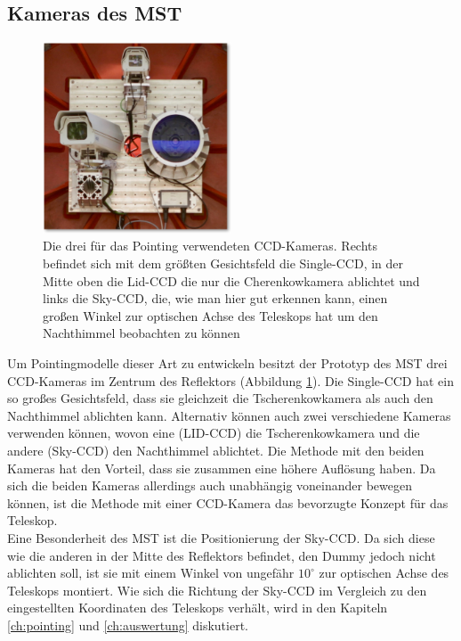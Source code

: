 \subsection{Kameras des MST}
\label{se:cameras}
\begin{figure}
\centering
\includegraphics[width=0.5\textwidth]{Images/ccd.png}
\caption{Die drei für das Pointing verwendeten CCD-Kameras. Rechts befindet sich mit dem größten Gesichtsfeld die Single-CCD, in der Mitte oben die Lid-CCD die nur die Cherenkowkamera ablichtet und links die Sky-CCD, die, wie man hier gut erkennen kann, einen großen Winkel zur optischen Achse des Teleskops hat um den Nachthimmel beobachten zu können}
\label{img:cameras}
\end{figure}
Um Pointingmodelle dieser Art zu entwickeln besitzt der Prototyp des MST drei CCD-Kameras im Zentrum des Reflektors (Abbildung \ref{img:cameras}). Die Single-CCD hat ein so großes Gesichtsfeld, dass sie gleichzeit die Tscherenkowkamera als auch den Nachthimmel ablichten kann. Alternativ können auch zwei verschiedene Kameras verwenden können, wovon eine (LID-CCD) die Tscherenkowkamera und die andere (Sky-CCD) den Nachthimmel ablichtet. Die Methode mit den beiden Kameras hat den Vorteil, dass sie zusammen eine höhere Auflösung haben. Da sich die beiden Kameras allerdings auch unabhängig voneinander bewegen können, ist die Methode mit einer CCD-Kamera das bevorzugte Konzept für das Teleskop\cite{pos}.\\
Eine Besonderheit des MST ist die Positionierung der Sky-CCD. Da sich diese wie die anderen in der Mitte des Reflektors befindet, den Dummy jedoch nicht ablichten soll, ist sie mit einem Winkel von ungefähr $10^{\circ}$ zur optischen Achse des Teleskops montiert. Wie sich die Richtung der Sky-CCD im Vergleich zu den eingestellten Koordinaten des Teleskops verhält, wird in den Kapiteln \ref{ch:pointing} und \ref{ch:auswertung} diskutiert.

